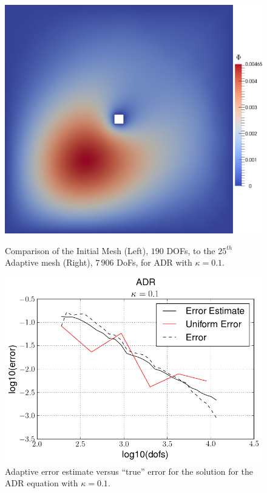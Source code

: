 \begin{test}[Diffusion Dominated ADR, $\kappa = 0.1$]
\begin{figure}[h]
\begin{minipage}[t]{0.49\textwidth}
{                \includegraphics[scale=0.1]{Figures/AdaptiveADRkappa1E-1_uDual25.png}
            }
        \end{minipage}
        \caption{Comparison of the Initial Mesh (Left), $190$ DOFs, to the
                 $25^{th}$ Adaptive mesh (Right), $7\, 906$ DoFs, for ADR with
                 $\kappa=0.1$.}
    \end{figure}

    \begin{figure}[h]
        \centering
        \includegraphics[scale=0.5]{Figures/AdaptiveADRkappa1E-1.png}
        \caption{Adaptive error estimate versus ``true'' error for the solution
            for the ADR equation with $\kappa=0.1$.}
        \label{fig:ADRk1E-1_err}
    \end{figure}
\end{test}

